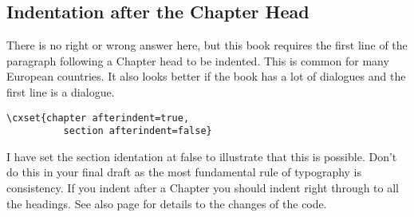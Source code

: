 \subsection{Indentation after the Chapter Head}

There is no right or wrong answer here, but this book requires the first line of the paragraph following a Chapter head to be indented. This is common for many European countries. It also looks better if the book has a lot of dialogues and the first line is a dialogue.

\begin{verbatim}
\cxset{chapter afterindent=true,
          section afterindent=false}
\end{verbatim}

I have set the section identation at false to illustrate that this is possible. Don’t do this in your final draft as the most fundamental rule of typography is consistency. If you indent after a Chapter you should indent right through to all the headings. See also page \pageref{code:chapterafterindent} for details to the changes of the \latexe code. 


